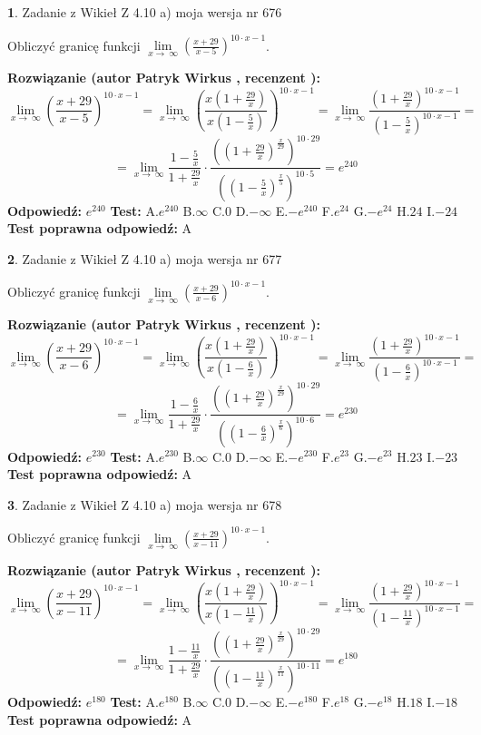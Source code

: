 \documentclass[12pt, a4paper]{article}
\theoremstyle{definition} %
\newtheorem{zad}{}
\newcommand{\zadStart}[1]{\begin{zad}#1\newline}
\newcommand{\zadStop}{\end{zad}}
\newcommand{\rozwStart}[2]{\noindent \textbf{Rozwiązanie (autor #1 , recenzent #2): }\newline}
\newcommand{\rozwStop}{\newline}
\newcommand{\odpStart}{\noindent \textbf{Odpowiedź:}\newline}
\newcommand{\odpStop}{\newline}
\newcommand{\testStart}{\noindent \textbf{Test:}\newline}
\newcommand{\testStop}{\newline}
\newcommand{\kluczStart}{\noindent \textbf{Test poprawna odpowiedź:}\newline}
\newcommand{\kluczStop}{\newline}
\begin{document}
\zadStart{Zadanie z Wikieł Z 4.10 a) moja wersja nr 676}

Obliczyć granicę funkcji  $\lim\limits_{x\to\ \infty}(\frac{x+29}{x-5})^{10\cdot x-1}$.
\zadStop
\rozwStart{Patryk Wirkus}{}
$$\lim\limits_{x\to\ \infty}(\frac{x+29}{x-5})^{10\cdot x-1} = \lim\limits_{x\to\ \infty}(\frac{x(1+\frac{29}{x})}{x(1-\frac{5}{x})})^{10\cdot x-1}=\lim\limits_{x\to\ \infty}\frac{(1+\frac{29}{x})^{10\cdot x-1}}{(1-\frac{5}{x})^{10\cdot x-1}}=$$
$$=\lim\limits_{x\to\ \infty}\frac{1-\frac{5}{x}}{1+\frac{29}{x}}\cdot\frac{((1+\frac{29}{x})^{\frac{x}{29}})^{10\cdot29}}{((1-\frac{5}{x})^{\frac{x}{5}})^{10\cdot5}}=e^{240}$$
\rozwStop
\odpStart
$e^{240}$
\odpStop
\testStart
A.$e^{240}$ B.$\infty$ C.$0$ D.$-\infty$ E.$-e^{240}$
F.$e^{24}$ G.$-e^{24}$
H.$24$
I.$-24$
\testStop
\kluczStart
A
\kluczStop



\zadStart{Zadanie z Wikieł Z 4.10 a) moja wersja nr 677}

Obliczyć granicę funkcji  $\lim\limits_{x\to\ \infty}(\frac{x+29}{x-6})^{10\cdot x-1}$.
\zadStop
\rozwStart{Patryk Wirkus}{}
$$\lim\limits_{x\to\ \infty}(\frac{x+29}{x-6})^{10\cdot x-1} = \lim\limits_{x\to\ \infty}(\frac{x(1+\frac{29}{x})}{x(1-\frac{6}{x})})^{10\cdot x-1}=\lim\limits_{x\to\ \infty}\frac{(1+\frac{29}{x})^{10\cdot x-1}}{(1-\frac{6}{x})^{10\cdot x-1}}=$$
$$=\lim\limits_{x\to\ \infty}\frac{1-\frac{6}{x}}{1+\frac{29}{x}}\cdot\frac{((1+\frac{29}{x})^{\frac{x}{29}})^{10\cdot29}}{((1-\frac{6}{x})^{\frac{x}{6}})^{10\cdot6}}=e^{230}$$
\rozwStop
\odpStart
$e^{230}$
\odpStop
\testStart
A.$e^{230}$ B.$\infty$ C.$0$ D.$-\infty$ E.$-e^{230}$
F.$e^{23}$ G.$-e^{23}$
H.$23$
I.$-23$
\testStop
\kluczStart
A
\kluczStop



\zadStart{Zadanie z Wikieł Z 4.10 a) moja wersja nr 678}

Obliczyć granicę funkcji  $\lim\limits_{x\to\ \infty}(\frac{x+29}{x-11})^{10\cdot x-1}$.
\zadStop
\rozwStart{Patryk Wirkus}{}
$$\lim\limits_{x\to\ \infty}(\frac{x+29}{x-11})^{10\cdot x-1} = \lim\limits_{x\to\ \infty}(\frac{x(1+\frac{29}{x})}{x(1-\frac{11}{x})})^{10\cdot x-1}=\lim\limits_{x\to\ \infty}\frac{(1+\frac{29}{x})^{10\cdot x-1}}{(1-\frac{11}{x})^{10\cdot x-1}}=$$
$$=\lim\limits_{x\to\ \infty}\frac{1-\frac{11}{x}}{1+\frac{29}{x}}\cdot\frac{((1+\frac{29}{x})^{\frac{x}{29}})^{10\cdot29}}{((1-\frac{11}{x})^{\frac{x}{11}})^{10\cdot11}}=e^{180}$$
\rozwStop
\odpStart
$e^{180}$
\odpStop
\testStart
A.$e^{180}$ B.$\infty$ C.$0$ D.$-\infty$ E.$-e^{180}$
F.$e^{18}$ G.$-e^{18}$
H.$18$
I.$-18$
\testStop
\kluczStart
A
\kluczStop
\end{document}
